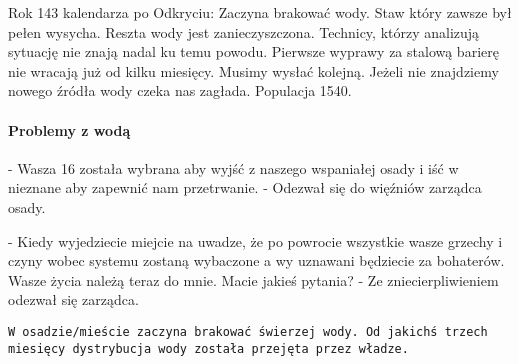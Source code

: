 \documentclass{article}
\newcommand{\paragraphx}[1]{
        \paragraph{\Large{{#1}}}\mbox{}

    }
\begin{document}
    Rok 143 kalendarza po Odkryciu: Zaczyna brakować wody. Staw który zawsze był pełen wysycha. Reszta wody jest zanieczyszczona. Technicy, którzy analizują sytuację nie znają nadal ku temu powodu. Pierwsze wyprawy za stalową barierę nie wracają już od kilku miesięcy. Musimy wysłać kolejną. Jeżeli nie znajdziemy nowego źródła wody czeka nas zagłada. Populacja 1540.

    \paragraphx{Problemy z wodą}
    - Wasza 16 została wybrana aby wyjść z naszego wspaniałej osady i iść w nieznane aby zapewnić nam przetrwanie. - Odezwał się do więźniów zarządca osady.

    - Kiedy wyjedziecie miejcie na uwadze, że po powrocie wszystkie wasze grzechy i czyny wobec systemu zostaną wybaczone a wy uznawani będziecie za bohaterów. Wasze życia należą teraz do mnie. Macie jakieś pytania? - Ze zniecierpliwieniem odezwał się zarządca.

    \texttt{W osadzie/mieście zaczyna brakować świerzej wody. Od jakichś trzech miesięcy dystrybucja wody została przejęta przez władze.}

    
\end{document}
